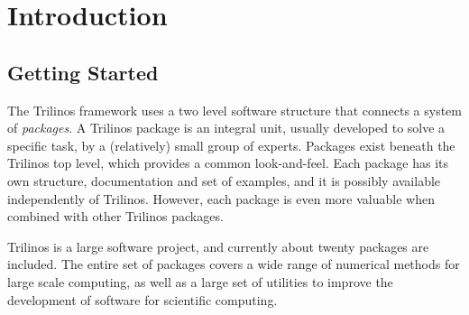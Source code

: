 % 
% 
% 
%  
%  
% 

\section{Introduction}


\subsection{Getting Started}
\label{sec:getting}

The Trilinos framework uses a two level software structure that connects
a system of {\sl packages}. A Trilinos package is an integral unit,
usually developed to solve a specific task, by a (relatively) small
group of experts.  Packages exist beneath the Trilinos top level,
which provides a common look-and-feel. Each package has its own
structure, documentation and set of examples, and it is possibly
available independently of Trilinos. However, each package is even more
valuable when combined with other Trilinos packages.

\smallskip

Trilinos is a large software project, and currently about twenty
packages are included.  The entire set of packages covers a wide range
of numerical methods for large scale computing, as well as a large set
of utilities to improve the development of software for scientific
computing. 

